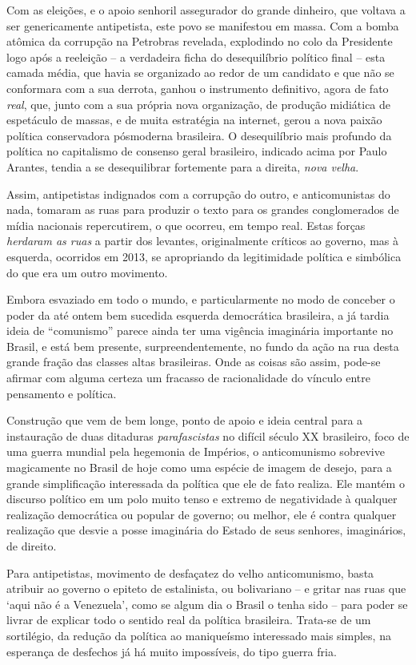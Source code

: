 Com as eleições, e o apoio senhoril assegurador do grande dinheiro, que
voltava a ser genericamente antipetista, este povo se manifestou em
massa. Com a bomba atômica da corrupção na Petrobras revelada,
explodindo no colo da Presidente logo após a reeleição -- a verdadeira
ficha do desequilíbrio político final -- esta camada média, que havia se
organizado ao redor de um candidato e que não se conformara com a sua
derrota, ganhou o instrumento definitivo, agora de fato \emph{real},
que, junto com a sua própria nova organização, de produção midiática de
espetáculo de massas, e de muita estratégia na internet, gerou a nova
paixão política conservadora pósmoderna brasileira. O desequilíbrio mais
profundo da política no capitalismo de consenso geral brasileiro,
indicado acima por Paulo Arantes, tendia a se desequilibrar fortemente
para a direita, \emph{nova velha}.

Assim, antipetistas indignados com a corrupção do outro, e
anticomunistas do nada, tomaram as ruas para produzir o texto para os
grandes conglomerados de mídia nacionais repercutirem, o que ocorreu, em
tempo real. Estas forças \emph{herdaram as ruas} a partir dos levantes,
originalmente críticos ao governo, mas à esquerda, ocorridos em 2013, se
apropriando da legitimidade política e simbólica do que era um outro
movimento.

Embora esvaziado em todo o mundo, e particularmente no modo de conceber
o poder da até ontem bem sucedida esquerda democrática brasileira, a já
tardia ideia de ``comunismo'' parece ainda ter uma vigência imaginária
importante no Brasil, e está bem presente, surpreendentemente, no fundo
da ação na rua desta grande fração das classes altas brasileiras. Onde
as coisas são assim, pode-se afirmar com alguma certeza um fracasso de
racionalidade do vínculo entre pensamento e política.

Construção que vem de bem longe, ponto de apoio e ideia central para a
instauração de duas ditaduras \emph{parafascistas} no difícil século XX
brasileiro, foco de uma guerra mundial pela hegemonia de Impérios, o
anticomunismo sobrevive magicamente no Brasil de hoje como uma espécie
de imagem de desejo, para a grande simplificação interessada da política
que ele de fato realiza. Ele mantém o discurso político em um polo muito
tenso e extremo de negatividade à qualquer realização democrática ou
popular de governo; ou melhor, ele é contra qualquer realização que
desvie a posse imaginária do Estado de seus senhores, imaginários, de
direito.

Para antipetistas, movimento de desfaçatez do velho anticomunismo, basta
atribuir ao governo o epiteto de estalinista, ou bolivariano -- e gritar
nas ruas que `aqui não é a Venezuela', como se algum dia o Brasil o
tenha sido -- para poder se livrar de explicar todo o sentido real da
política brasileira. Trata-se de um sortilégio, da redução da política
ao maniqueísmo interessado mais simples, na esperança de desfechos já há
muito impossíveis, do tipo guerra fria.

